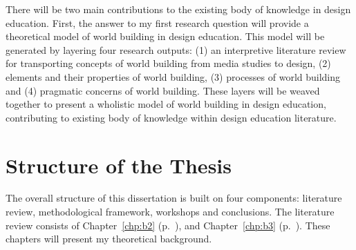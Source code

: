 	There will be two main contributions to the existing body of knowledge in design education. First, the answer to my first research question will provide a theoretical model of world building in design education. This model will be generated by layering four research outputs: (1) an interpretive literature review for transporting concepts of world building from media studies to design, (2) elements and their properties of world building, (3) processes of world building and (4) pragmatic concerns of world building. These layers will be weaved together to present a wholistic model of world building in design education, contributing to existing body of knowledge within design education literature.
	

\section{Structure of the Thesis}
	The overall structure of this dissertation is built on four components: literature review, methodological framework, workshops and conclusions. The literature review consists of Chapter~\ref{chp:b2} (p.~\pageref{chp:b2}), and Chapter~\ref{chp:b3} (p.~\pageref{chp:b3}). These chapters will present my theoretical background. 
